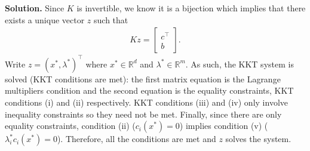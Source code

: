 \documentclass{letter}
\newcommand{\Solution}[1]{%
	\textbf{Solution.} #1 \par%
}
\newcommand{\T}{\intercal}
\newcommand{\R}{\mathbb{R}}
\begin{document}
    \Solution{Since $K$ is invertible, we know it is a bijection which implies that there exists a unique vector $z$ such that \begin{align*}
        Kz = \begin{bmatrix} c^\T \\ b \end{bmatrix}.
    \end{align*} Write $z = (x^*, \lambda^*)^\T$ where $x^* \in \R^d$ and $\lambda^* \in \R^m$. As such, the KKT system is solved (KKT conditions are met): the first matrix equation is the Lagrange multipliers condition and the second equation is the equality constraints, KKT conditions (i) and (ii) respectively. KKT conditions (iii) and (iv) only involve inequality constraints so they need not be met. Finally, since there are only equality constraints, condition (ii) ($c_i(x^*) = 0$) implies condition (v) ($\lambda_i^*c_i(x^*) = 0$). Therefore, all the conditions are met and $z$ solves the system.}
\end{document}
